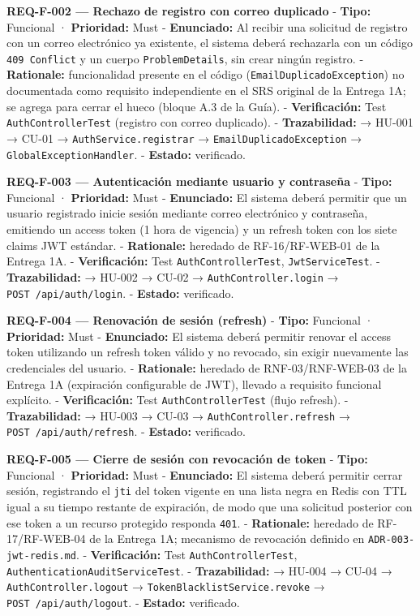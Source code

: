 \documentclass[
]{article}
\begin{document}
\textbf{REQ-F-002 --- Rechazo de registro con correo duplicado} -
\textbf{Tipo:} Funcional · \textbf{Prioridad:} Must -
\textbf{Enunciado:} Al recibir una solicitud de registro con un correo
electrónico ya existente, el sistema deberá rechazarla con un código
\texttt{409\ Conflict} y un cuerpo \texttt{ProblemDetails}, sin crear
ningún registro. - \textbf{Rationale:} funcionalidad presente en el
código (\texttt{EmailDuplicadoException}) no documentada como requisito
independiente en el SRS original de la Entrega 1A; se agrega para cerrar
el hueco (bloque A.3 de la Guía). - \textbf{Verificación:} Test
\texttt{AuthControllerTest} (registro con correo duplicado). -
\textbf{Trazabilidad:} → HU-001 → CU-01 → \texttt{AuthService.registrar}
→ \texttt{EmailDuplicadoException} → \texttt{GlobalExceptionHandler}. -
\textbf{Estado:} verificado.

\textbf{REQ-F-003 --- Autenticación mediante usuario y contraseña} -
\textbf{Tipo:} Funcional · \textbf{Prioridad:} Must -
\textbf{Enunciado:} El sistema deberá permitir que un usuario registrado
inicie sesión mediante correo electrónico y contraseña, emitiendo un
access token (1 hora de vigencia) y un refresh token con los siete
claims JWT estándar. - \textbf{Rationale:} heredado de RF-16/RF-WEB-01
de la Entrega 1A. - \textbf{Verificación:} Test
\texttt{AuthControllerTest}, \texttt{JwtServiceTest}. -
\textbf{Trazabilidad:} → HU-002 → CU-02 → \texttt{AuthController.login}
→ \texttt{POST\ /api/auth/login}. - \textbf{Estado:} verificado.

\textbf{REQ-F-004 --- Renovación de sesión (refresh)} - \textbf{Tipo:}
Funcional · \textbf{Prioridad:} Must - \textbf{Enunciado:} El sistema
deberá permitir renovar el access token utilizando un refresh token
válido y no revocado, sin exigir nuevamente las credenciales del
usuario. - \textbf{Rationale:} heredado de RNF-03/RNF-WEB-03 de la
Entrega 1A (expiración configurable de JWT), llevado a requisito
funcional explícito. - \textbf{Verificación:} Test
\texttt{AuthControllerTest} (flujo refresh). - \textbf{Trazabilidad:} →
HU-003 → CU-03 → \texttt{AuthController.refresh} →
\texttt{POST\ /api/auth/refresh}. - \textbf{Estado:} verificado.

\textbf{REQ-F-005 --- Cierre de sesión con revocación de token} -
\textbf{Tipo:} Funcional · \textbf{Prioridad:} Must -
\textbf{Enunciado:} El sistema deberá permitir cerrar sesión,
registrando el \texttt{jti} del token vigente en una lista negra en
Redis con TTL igual a su tiempo restante de expiración, de modo que una
solicitud posterior con ese token a un recurso protegido responda
\texttt{401}. - \textbf{Rationale:} heredado de RF-17/RF-WEB-04 de la
Entrega 1A; mecanismo de revocación definido en
\texttt{ADR-003-jwt-redis.md}. - \textbf{Verificación:} Test
\texttt{AuthControllerTest}, \texttt{AuthenticationAuditServiceTest}. -
\textbf{Trazabilidad:} → HU-004 → CU-04 → \texttt{AuthController.logout}
→ \texttt{TokenBlacklistService.revoke} →
\texttt{POST\ /api/auth/logout}. - \textbf{Estado:} verificado.
\end{document}

